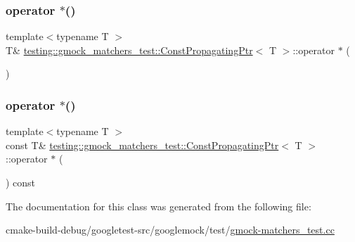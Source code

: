 \mbox{\label{classtesting_1_1gmock__matchers__test_1_1ConstPropagatingPtr_a2bca17628b50e37f8ea323b0e80bdc3a}} 
\subsubsection{\texorpdfstring{operator $\ast$()}{operator *()}\hspace{0.1cm}{\footnotesize\ttfamily [1/2]}}
{\footnotesize\ttfamily template$<$typename T $>$ \\
T\& \mbox{\hyperlink{classtesting_1_1gmock__matchers__test_1_1ConstPropagatingPtr}{testing\+::gmock\+\_\+matchers\+\_\+test\+::\+Const\+Propagating\+Ptr}}$<$ T $>$\+::operator $\ast$ (\begin{DoxyParamCaption}{ }\end{DoxyParamCaption})\hspace{0.3cm}{\ttfamily [inline]}}

\mbox{\label{classtesting_1_1gmock__matchers__test_1_1ConstPropagatingPtr_af081ba59bba8a9453c4537aab846ebaf}} 
\subsubsection{\texorpdfstring{operator $\ast$()}{operator *()}\hspace{0.1cm}{\footnotesize\ttfamily [2/2]}}
{\footnotesize\ttfamily template$<$typename T $>$ \\
const T\& \mbox{\hyperlink{classtesting_1_1gmock__matchers__test_1_1ConstPropagatingPtr}{testing\+::gmock\+\_\+matchers\+\_\+test\+::\+Const\+Propagating\+Ptr}}$<$ T $>$\+::operator $\ast$ (\begin{DoxyParamCaption}{ }\end{DoxyParamCaption}) const\hspace{0.3cm}{\ttfamily [inline]}}



The documentation for this class was generated from the following file\+:\begin{DoxyCompactItemize}
\item 
cmake-\/build-\/debug/googletest-\/src/googlemock/test/\mbox{\hyperlink{gmock-matchers__test_8cc}{gmock-\/matchers\+\_\+test.\+cc}}\end{DoxyCompactItemize}
